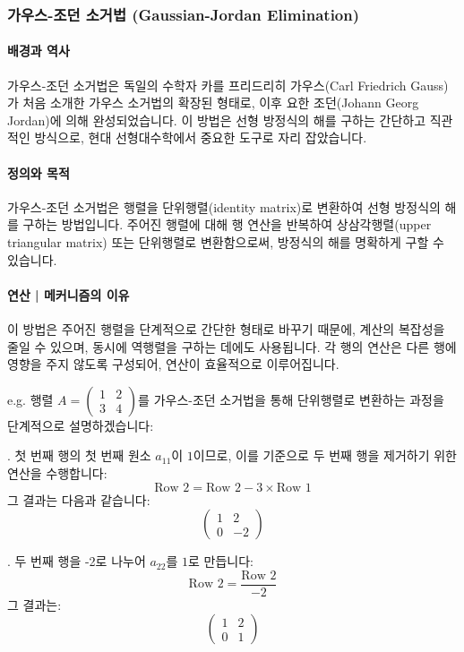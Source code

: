 \subsubsection{가우스-조던 소거법 (Gaussian-Jordan Elimination)}

\paragraph{배경과 역사}
가우스-조던 소거법은 독일의 수학자 카를 프리드리히 가우스(Carl Friedrich Gauss)가 처음 소개한 가우스 소거법의 확장된 형태로, 이후 요한 조던(Johann Georg Jordan)에 의해 완성되었습니다. 이 방법은 선형 방정식의 해를 구하는 간단하고 직관적인 방식으로, 현대 선형대수학에서 중요한 도구로 자리 잡았습니다.

\paragraph{정의와 목적}
가우스-조던 소거법은 행렬을 단위행렬(identity matrix)로 변환하여 선형 방정식의 해를 구하는 방법입니다. 주어진 행렬에 대해 행 연산을 반복하여 상삼각행렬(upper triangular matrix) 또는 단위행렬로 변환함으로써, 방정식의 해를 명확하게 구할 수 있습니다.

\paragraph{연산 | 메커니즘의 이유}
이 방법은 주어진 행렬을 단계적으로 간단한 형태로 바꾸기 때문에, 계산의 복잡성을 줄일 수 있으며, 동시에 역행렬을 구하는 데에도 사용됩니다. 각 행의 연산은 다른 행에 영향을 주지 않도록 구성되어, 연산이 효율적으로 이루어집니다.

\vspace{1\baselineskip}
\noindent {} e.g. 행렬 \( A = \begin{pmatrix} 1 & 2 \\ 3 & 4 \end{pmatrix} \)를 가우스-조던 소거법을 통해 단위행렬로 변환하는 과정을 단계적으로 설명하겠습니다:

. 첫 번째 행의 첫 번째 원소 \( a_{11} \)이 \(1\)이므로, 이를 기준으로 두 번째 행을 제거하기 위한 연산을 수행합니다:
\[
  \text{Row 2} = \text{Row 2} - 3 \times \text{Row 1}
\]
그 결과는 다음과 같습니다:
\[
  \begin{pmatrix} 1 & 2 \\ 0 & -2 \end{pmatrix}
\]

. 두 번째 행을 -2로 나누어 \( a_{22} \)를 \( 1 \)로 만듭니다:
\[
  \text{Row 2} = \frac{\text{Row 2}}{-2}
\]
그 결과는:
\[
  \begin{pmatrix} 1 & 2 \\ 0 & 1 \end{pmatrix}
\]

